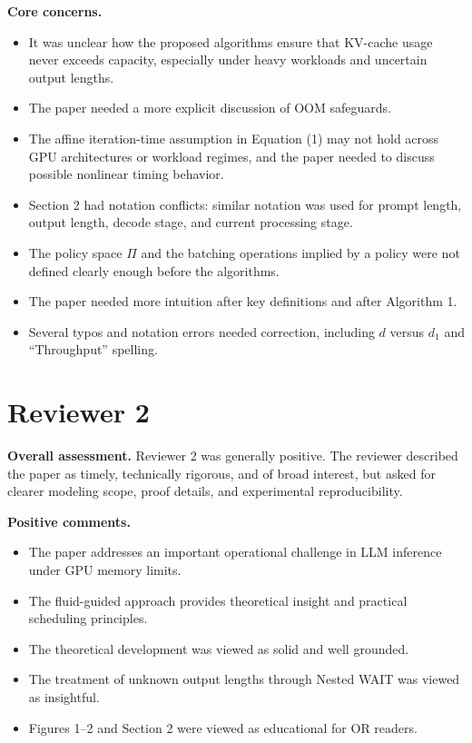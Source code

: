 \documentclass[11pt]{article}
\begin{document}
\textbf{Core concerns.}
\begin{itemize}
    \item It was unclear how the proposed algorithms ensure that KV-cache usage never exceeds capacity, especially under heavy workloads and uncertain output lengths.
    \item The paper needed a more explicit discussion of OOM safeguards.
    \item The affine iteration-time assumption in Equation (1) may not hold across GPU architectures or workload regimes, and the paper needed to discuss possible nonlinear timing behavior.
    \item Section 2 had notation conflicts: similar notation was used for prompt length, output length, decode stage, and current processing stage.
    \item The policy space \(\Pi\) and the batching operations implied by a policy were not defined clearly enough before the algorithms.
    \item The paper needed more intuition after key definitions and after Algorithm 1.
    \item Several typos and notation errors needed correction, including \(d\) versus \(d_1\) and ``Throughput'' spelling.
\end{itemize}

\section*{Reviewer 2}

\textbf{Overall assessment.} Reviewer 2 was generally positive. The reviewer described the paper as timely, technically rigorous, and of broad interest, but asked for clearer modeling scope, proof details, and experimental reproducibility.

\textbf{Positive comments.}
\begin{itemize}
    \item The paper addresses an important operational challenge in LLM inference under GPU memory limits.
    \item The fluid-guided approach provides theoretical insight and practical scheduling principles.
    \item The theoretical development was viewed as solid and well grounded.
    \item The treatment of unknown output lengths through Nested WAIT was viewed as insightful.
    \item Figures 1--2 and Section 2 were viewed as educational for OR readers.
\end{itemize}
\end{document}
